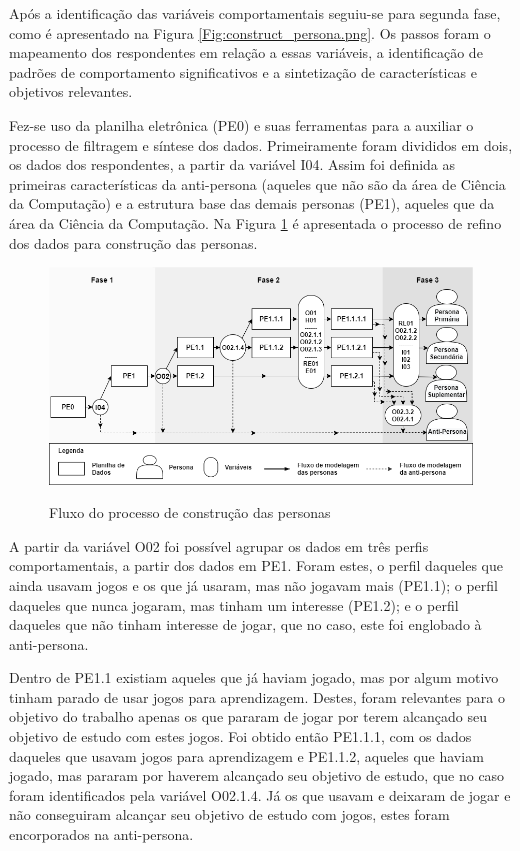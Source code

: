 Após a identificação das variáveis comportamentais seguiu-se para segunda fase, como é apresentado na Figura \ref{Fig:construct_persona.png}. Os passos foram o mapeamento dos respondentes em relação a essas variáveis, a identificação de padrões de comportamento significativos e a sintetização de características e objetivos relevantes.

Fez-se uso da planilha eletrônica (PE0) e suas ferramentas para a auxiliar o processo de filtragem e síntese dos dados. Primeiramente foram divididos em dois, os dados dos respondentes, a partir da variável I04. Assim foi definida as primeiras características da anti-persona (aqueles que não são da área de Ciência da Computação) e a estrutura base das demais personas (PE1), aqueles que da área da Ciência da Computação. Na Figura \ref{Fig:persona_tree.png} é apresentada o processo de refino dos dados para construção das personas.

\begin{figure}[htbp]
	\centering
	\caption{Fluxo do processo de construção das personas}
	\includegraphics[keepaspectratio=true,scale=0.55]{figuras/metodologia/persona_tree.png}
	\label{Fig:persona_tree.png}
\end{figure}


A partir da variável O02 foi possível agrupar os dados em três perfis comportamentais, a partir dos dados em PE1. Foram estes, o perfil daqueles que ainda usavam jogos e os que já usaram, mas não jogavam mais (PE1.1); o perfil  daqueles que nunca jogaram, mas tinham um interesse (PE1.2); e o perfil daqueles que não tinham interesse de jogar, que no caso, este foi englobado à anti-persona.

Dentro de PE1.1 existiam aqueles que já haviam jogado, mas por algum motivo tinham parado de usar jogos para aprendizagem. Destes, foram relevantes para o objetivo do trabalho apenas os que pararam de jogar por terem alcançado seu objetivo de estudo com estes jogos. Foi obtido então PE1.1.1, com  os dados daqueles que usavam jogos para aprendizagem e PE1.1.2, aqueles que haviam jogado, mas pararam por haverem alcançado seu objetivo de estudo, que no caso foram identificados pela variável O02.1.4. Já os que usavam e deixaram de jogar e não conseguiram alcançar seu objetivo de estudo com jogos, estes foram encorporados na anti-persona.

